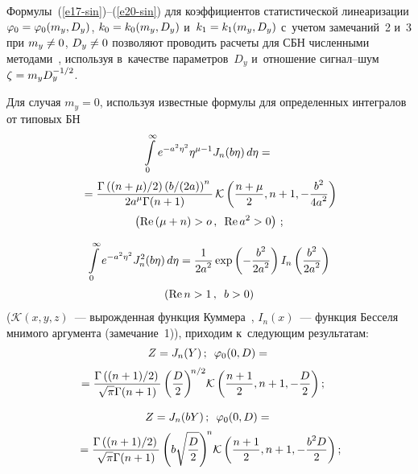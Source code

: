 \begin{multicols}{2}
{Формулы~(\ref{e17-sin})--(\ref{e20-sin}) для коэффициентов статистической 
линеаризации $\vrp_0\hm=\vrp_0(m_y, D_y)$, $k_0\hm=k_0(m_y, D_y)$ 
и~$k_1\hm=k_1(m_y, D_y)$ с~учетом замечаний~2 и~3 при $m_y\hm\ne 0$, $D_y\hm \ne 0$ 
позволяют проводить расчеты для СБН численными методами~\cite{11-sin}, 
используя в~качестве параметров~$D_y$ и~отношение сиг\-нал--шум $\zeta \hm= m_y D_y^{-1/2}$.

Для случая $m_y=0$, используя известные формулы для определенных интегралов от 
типовых БН~\cite{6-sin, 7-sin}
\begin{multline*}
\int\limits_0^\infty e^{-a^2\eta^2} \eta^{\mu-1} J_n (b\eta)\, d\eta = {}\\[2pt]
{}=\displaystyle\frac{\displaystyle \Gamma \left((n+\mu)/2\right) \left(b/(2a)\right)^n\mathstrut}{\displaystyle 2a^\mu \Gamma (n+1)\mathstrut}\,
\mathcal{K} \left( \displaystyle\frac{\displaystyle n+\mu\mathstrut}{\displaystyle 2\mathstrut}, n+1, -\displaystyle\frac{\displaystyle b^2\mathstrut}{\displaystyle 4a^2\mathstrut}\right)\\[2pt]
 \left(\mathrm{Re}\,(\mu+n) >o\,,\enskip
    \mathrm{Re}\, a^2 >0\right)\,;
    \end{multline*}

\vspace*{-12pt}

\noindent
\begin{multline*}
\int\limits_0^\infty e^{-a^2\eta^2} J_n^2 (b\eta) \,d\eta = \displaystyle\frac{\displaystyle 1\mathstrut}{\displaystyle 2a^2\mathstrut} \exp  
\left(-\displaystyle\frac{\displaystyle b^2\mathstrut}{\displaystyle 2a^2\mathstrut}\right)I_n \left( \displaystyle\frac{\displaystyle b^2\mathstrut}{\displaystyle 2a^2\mathstrut}\right) \\[2pt]
    \left(\mathrm{Re} \, n>1\,,\enskip b>0\right)
\end{multline*}
($\mathcal{K} (x,y,z)$~--- вырожденная функция Куммера~\cite{7-sin},  
$I_n (x)$~--- функция Бесселя мнимого аргумента (замечание~1)), 
приходим к~следующим результатам:
\begin{multline}
Z= J_n (Y) \,;\enskip \vrp_0 (0,D) ={}\\[2pt]
\hspace*{-5mm}{}= \fr{\Gamma \left(({n+1})/2\right) }{\sqrt{\pi} \Gamma(n+1)} \left( 
\fr{D}{2}\right)^{\!n/2}\! \mathcal{K}
     \left( \fr{n+1}{2} , n+1, -\fr{D}{2}\right);
     \label{e1.3-sin}
     \end{multline}
     
     \vspace*{-12pt}
     
     \begin{multline*}
Z= J_n (bY) \,;\enskip \varphi_0 (0,D) = {}\\[2pt]
{}=\displaystyle\frac{\displaystyle \Gamma \left((n+1)/2\right) \mathstrut}{\displaystyle \sqrt{\pi} \Gamma(n+1)\mathstrut} \left( b\sqrt{\displaystyle\frac{\displaystyle D\mathstrut}{\displaystyle 2\mathstrut}}\right)^{\!n}\! \mathcal{K}
     \left( \displaystyle\frac{\displaystyle n+1\mathstrut}{\displaystyle 2\mathstrut} , n+1, -\displaystyle\frac{\displaystyle b^2D\mathstrut}{\displaystyle 2\mathstrut}\right);
     \end{multline*}
     
}
\end{multicols}
